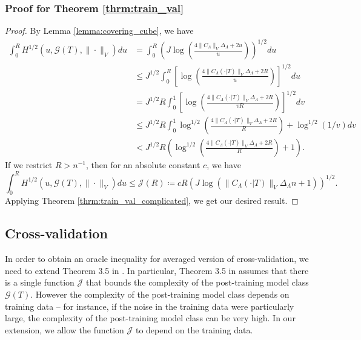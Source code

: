 \documentclass[10pt]{book}
\theoremstyle{definition}
\begin{document}
\subsubsection{Proof for Theorem \ref{thrm:train_val}}
\begin{proof}
	By Lemma \ref{lemma:covering_cube}, we have
	\begin{align}
	\int_{0}^{R}H^{1/2}(u,\mathcal{G}(T),\|\cdot\|_{V})du 
	&= \int_{0}^{R} \left ( 
	J \log \left(\frac{4 \|C_\Lambda\|_V \Delta_{\Lambda}+2u}{u}\right)
	\right )^{1/2}
	du\\
	& \le J^{1/2}\int_{0}^{R}\left[
	\log\left(
	\frac{4 \|C_\Lambda(\cdot | T)\|_V \Delta_{\Lambda} + 2R }
	{u}
	\right)
	\right]^{1/2}du\\
	& = J^{1/2}R \int_{0}^{1}\left[
	\log\left(
	\frac{4 \|C_\Lambda(\cdot | T)\|_V \Delta_{\Lambda} + 2R }
	{vR}
	\right)
	\right]^{1/2}dv\\
	& \le J^{1/2}R \int_{0}^{1}
	\log^{1/2}\left(
	\frac{4 \|C_\Lambda(\cdot | T)\|_V \Delta_{\Lambda} + 2R}
	{R}
	\right)
	+
	\log^{1/2}(1/v)
	dv\\
	& < J^{1/2}R \left (
	\log^{1/2}\left(
	\frac{4 \|C_\Lambda(\cdot | T)\|_V \Delta_{\Lambda} + 2R}
	{R}
	\right)
	+
	1
	\right ).
	\end{align}
	If we restrict $R > n^{-1}$, then for an absolute constant $c$, we have
	\begin{equation}
	\label{eq:train_val_entropy}
	\int_{0}^{R}H^{1/2}(u,\mathcal{G}(T),\|\cdot\|_{V})du
	\le
	\mathcal{J}(R) 
	\coloneqq c R\left ( J \log(\|C_\Lambda(\cdot |T)\|_V \Delta_{\Lambda} n + 1) \right )^{1/2}.
	\end{equation}
	Applying Theorem \ref{thrm:train_val_complicated}, we get our desired result.
\end{proof}

\subsection{Cross-validation}
\label{app:cv}
In order to obtain an oracle inequality for averaged version of cross-validation, we need to extend Theorem 3.5 in \citet{lecue2012oracle}.
In particular, Theorem 3.5 in \citet{lecue2012oracle} assumes that there is a single function $\mathcal{J}$ that bounds the complexity of the post-training model class $\mathcal{G}(T)$.
However the complexity of the post-training model class depends on training data -- for instance, if the noise in the training data were particularly large, the complexity of the post-training model class can be very high.
In our extension, we allow the function $\mathcal{J}$ to depend on the training data.
\end{document}
